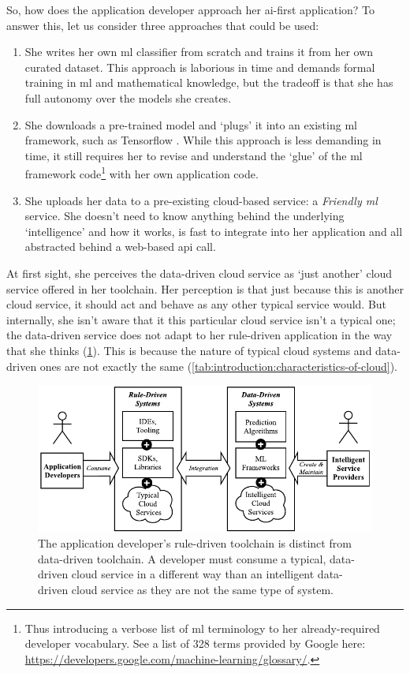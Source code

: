 So, how does the application developer approach her \gls{ai}-first application? To answer this, let us consider three approaches that could be used:

\begin{enumerate}
  \item She writes her own \gls{ml} classifier from scratch and trains it from her own curated dataset. This approach is laborious in time and demands formal training in \gls{ml} and mathematical knowledge, but the tradeoff is that she has full autonomy over the models she creates.
  \item She downloads a pre-trained model and `plugs' it into an existing \gls{ml} framework, such as Tensorflow \citep{Abadi:2016vn}. While this approach is less demanding in time, it still requires her to revise and understand the `glue' of the \gls{ml} framework code\footnote{Thus introducing a verbose list of \gls{ml} terminology to her already-required developer vocabulary. See a list of 328 terms provided by Google here: \url{https://developers.google.com/machine-learning/glossary/}.} with her own application code.
  \item She uploads her data to a pre-existing cloud-based service: a \textit{Friendly  \acrlong{ml}} service. She doesn't need to know anything behind the underlying `intelligence' and how it works, is fast to integrate into her application and all abstracted behind a web-based \gls{api} call.
\end{enumerate}

\noindent
At first sight, she perceives the data-driven cloud service as `just another' cloud service  offered in her toolchain. Her perception is that just because this is another cloud service, it should act and behave as any other typical service would. But internally, she isn't aware that it this particular cloud service isn't a typical one; the data-driven service does not adapt to her rule-driven application in the way that she thinks (\cref{fig:introduction:rule-vs-data}). This is because the nature of typical cloud systems and data-driven ones are not exactly the same (\cref{tab:introduction:characteristics-of-cloud}).

\begin{figure}[h!]
\centering
\caption[Differences between data- and rule-driven cloud services]{The application developer's rule-driven toolchain is distinct from data-driven toolchain. A developer must consume a typical, data-driven cloud service in a different way than an intelligent data-driven cloud service as they are not the same type of system.}
\label{fig:introduction:rule-vs-data}
\includegraphics{rule-vs-data}
\end{figure}

